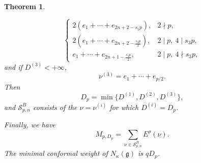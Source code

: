 \documentclass[11pt,a4paper]{amsart}
\theoremstyle{plain}
\newtheorem{theorem}{Theorem}[section]
\numberwithin{equation}{section}
\begin{document}
\begin{theorem}
\begin{enumerate}
\[\begin{cases}
2(e_1+\cdots+e_{2n+2-s_1p}), & 2\nmid p,\\
2(e_1+\cdots+e_{2n+2-\frac{s_3p}{2}}), & 2\mid p,\ 4\mid s_3p,\\
e_1+\cdots+e_{2n+1-\frac{s_3p}{2}}, & 2\mid p,\ 4\nmid s_3p,
\end{cases}
\]
and if  $D^{(3)}<+\infty$, 
\[
\nu^{(3)}=e_1+\cdots+e_{p/2}.
\]
Then
\[
D_p=\min\{D^{(1)},D^{(2)},D^{(3)}\},
\]
and \(\mathcal S^B_{p,n}\) consists of the $\nu=\nu^{(i)}$ for which \(D^{(i)}=D_p\). 
\end{enumerate}
 Finally, we have
\begin{equation}\label{eq:B-first-coefficient}
	M_{p,D_p}=\sum_{\nu\in\mathcal S^B_{p,n}}E^\rho(\nu).
\end{equation}
The minimal conformal weight of \(N_\kappa(\mathfrak g)\) is
\(qD_p\).
\end{theorem}
\end{document}
